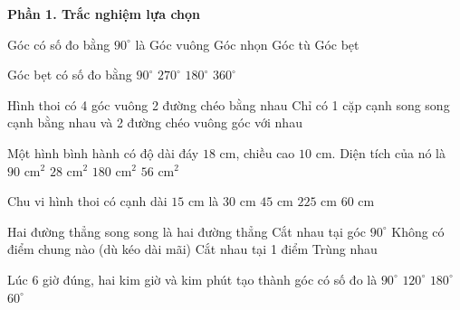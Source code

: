 \textbf{Phần 1. Trắc nghiệm lựa chọn}

\begin{ex} %
Góc có số đo bằng $90^\circ$ là
\choice
{\True Góc vuông}
{Góc nhọn}
{Góc tù}
{Góc bẹt}
\end{ex}

\begin{ex} %
Góc bẹt có số đo bằng
\choice
{$90^\circ$}
{$270^\circ$}
{\True $180^\circ$}
{$360^\circ$}
\end{ex}

\begin{ex} %
Hình thoi có
\choice
{4 góc vuông}
{2 đường chéo bằng nhau}
{Chỉ có 1 cặp cạnh song song}
{ cạnh bằng nhau và 2 đường chéo vuông góc với nhau}
\end{ex}

\begin{ex} %
Một hình bình hành có độ dài đáy $18\text{ cm}$, chiều cao $10\text{ cm}$. Diện tích của nó là
\choice
{$90\text{ cm}^2$}
{$28\text{ cm}^2$}
{\True $180\text{ cm}^2$}
{$56\text{ cm}^2$}
\end{ex}

\begin{ex} %
Chu vi hình thoi có cạnh dài $15\text{ cm}$ là
\choice
{$30\text{ cm}$}
{$45\text{ cm}$}
{$225\text{ cm}$}
{\True $60\text{ cm}$}
\end{ex}

\begin{ex} %
Hai đường thẳng song song là hai đường thẳng
\choice
{Cắt nhau tại góc $90^\circ$}
{\True Không có điểm chung nào (dù kéo dài mãi)}
{Cắt nhau tại 1 điểm}
{Trùng nhau}
\end{ex}

\begin{ex} %
Lúc 6 giờ đúng, hai kim giờ và kim phút tạo thành góc có số đo là
\choice
{$90^\circ$}
{$120^\circ$}
{\True $180^\circ$}
{$60^\circ$}
\end{ex}

